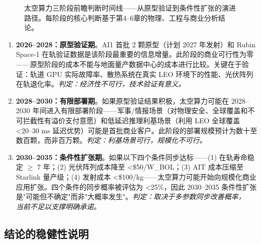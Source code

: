\begin{figure}[H]
\centering

\caption{太空算力三阶段前瞻判断时间线——从原型验证到条件性扩张的演进路径。每阶段的核心判断基于第4--6章的物理、工程与商业分析结论。}
\label{fig:timeline_outlook}
\end{figure}

\begin{enumerate}[leftmargin=*]
    \item \textbf{2026--2028：原型验证期}。AI1 首批 2 颗原型（计划 2027 年发射）和 Rubin Space-1 在轨验证数据是该阶段最重要的信息增量。此阶段的商业可行性为零——原型阶段的成本不能与地面量产数据中心的成本进行比较。关键在于验证：轨道 GPU 实际故障率、散热系统在真实 LEO 环境下的性能、光伏阵列在轨退化率。\emph{判定：经济性不可行，技术验证有意义。}

    \item \textbf{2028--2030：有限部署期}。如果原型验证结果积极，太空算力可能在 2028--2030 年间进入有限部署阶段——军事/情报场景（对物理安全、全球覆盖和不可拦截性有溢价支付意愿）和低延迟推理利基场景（利用 LEO 全球覆盖 <20--30 ms 延迟优势）可能是首批商业客户。此阶段的部署规模预计为数十至数百颗，而非百万颗。\emph{判定：利基场景可行，规模化不可行。}

    \item \textbf{2030--2035：条件性扩张期}。如果以下四个条件同步达标——(1) 在轨寿命稳定 $\geq$ 7 年；(2) 光伏阵列成本降至 <\$50/W\_BOL；(3) AIT 成本压缩至 Starlink 量产级；(4) 发射成本 <\$100/kg——太空算力可能开始向规模化商业应用扩张。四个条件的同步概率被评估为 <25\%，因此 2030--2035 条件性扩张是"可能但不确定"而非"大概率发生"。\emph{判定：取决于多参数同步改善概率，\\
    当前不足以支撑明确承诺。}
\end{enumerate}

\subsection{结论的稳健性说明}

